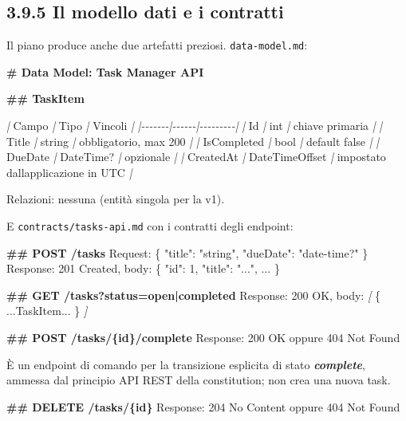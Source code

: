 \documentclass[
  italian,
  10pt,
]{book}
\newenvironment{Shaded}{\begin{snugshade}}{\end{snugshade}}
\newcommand{\CommentTok}[1]{\textcolor[rgb]{0.56,0.35,0.01}{\textit{#1}}}
\newcommand{\FunctionTok}[1]{\textcolor[rgb]{0.13,0.29,0.53}{\textbf{#1}}}
\newcommand{\InformationTok}[1]{\textcolor[rgb]{0.56,0.35,0.01}{\textbf{\textit{#1}}}}
\newcommand{\NormalTok}[1]{#1}
\newcommand{\OtherTok}[1]{\textcolor[rgb]{0.56,0.35,0.01}{#1}}
\newcommand{\PreprocessorTok}[1]{\textcolor[rgb]{0.56,0.35,0.01}{\textit{#1}}}
\begin{document}
\subsection{3.9.5 Il modello dati e i
contratti}\label{il-modello-dati-e-i-contratti}

Il piano produce anche due artefatti preziosi. \texttt{data-model.md}:

\begin{Shaded}
\begin{Highlighting}[]
\FunctionTok{\# Data Model: Task Manager API}

\FunctionTok{\#\# TaskItem}

\PreprocessorTok{|}\NormalTok{ Campo }\PreprocessorTok{|}\NormalTok{ Tipo }\PreprocessorTok{|}\NormalTok{ Vincoli }\PreprocessorTok{|}
\PreprocessorTok{|{-}{-}{-}{-}{-}{-}{-}|{-}{-}{-}{-}{-}{-}|{-}{-}{-}{-}{-}{-}{-}{-}{-}|}
\PreprocessorTok{|}\NormalTok{ Id }\PreprocessorTok{|}\NormalTok{ int }\PreprocessorTok{|}\NormalTok{ chiave primaria }\PreprocessorTok{|}
\PreprocessorTok{|}\NormalTok{ Title }\PreprocessorTok{|}\NormalTok{ string }\PreprocessorTok{|}\NormalTok{ obbligatorio, max 200 }\PreprocessorTok{|}
\PreprocessorTok{|}\NormalTok{ IsCompleted }\PreprocessorTok{|}\NormalTok{ bool }\PreprocessorTok{|}\NormalTok{ default false }\PreprocessorTok{|}
\PreprocessorTok{|}\NormalTok{ DueDate }\PreprocessorTok{|}\NormalTok{ DateTime? }\PreprocessorTok{|}\NormalTok{ opzionale }\PreprocessorTok{|}
\PreprocessorTok{|}\NormalTok{ CreatedAt }\PreprocessorTok{|}\NormalTok{ DateTimeOffset }\PreprocessorTok{|}\NormalTok{ impostato dall\textquotesingle{}applicazione in UTC }\PreprocessorTok{|}

\NormalTok{Relazioni: nessuna (entità singola per la v1).}
\end{Highlighting}
\end{Shaded}

E \texttt{contracts/tasks-api.md} con i contratti degli endpoint:

\begin{Shaded}
\begin{Highlighting}[]
\FunctionTok{\#\# POST /tasks}
\NormalTok{Request:  \{ "title": "string", "dueDate": "date{-}time?" \}}
\NormalTok{Response: 201 Created, body: \{ "id": 1, "title": "...", ... \}}

\FunctionTok{\#\# GET /tasks?status=open|completed}
\NormalTok{Response: 200 OK, body: }\CommentTok{[}\OtherTok{ \{ ...TaskItem... \} }\CommentTok{]}

\FunctionTok{\#\# POST /tasks/\{id\}/complete}
\NormalTok{Response: 200 OK oppure 404 Not Found}

\NormalTok{È un endpoint di comando per la transizione esplicita di stato }\InformationTok{\textasciigrave{}complete\textasciigrave{}}\NormalTok{,}
\NormalTok{ammessa dal principio API REST della constitution; non crea una nuova task.}

\FunctionTok{\#\# DELETE /tasks/\{id\}}
\NormalTok{Response: 204 No Content oppure 404 Not Found}
\end{Highlighting}
\end{Shaded}
\end{document}
